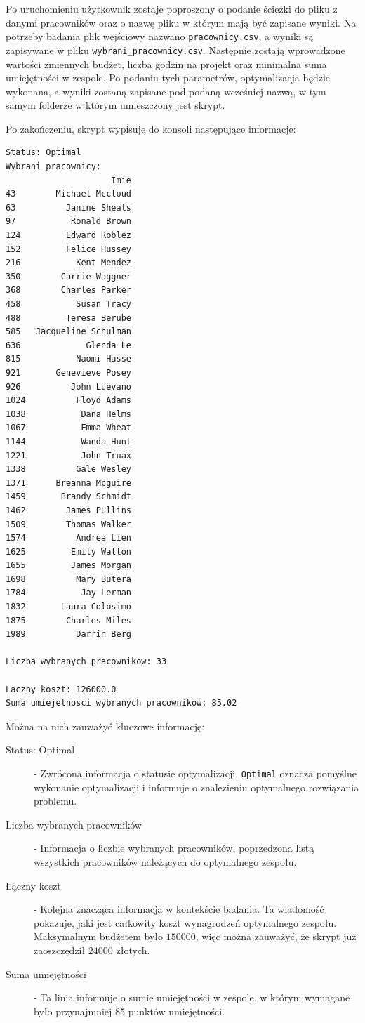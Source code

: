    \par Po uruchomieniu użytkownik zostaje poproszony o podanie ścieżki do pliku z danymi pracowników oraz o nazwę pliku w którym mają być zapisane wyniki. Na potrzeby badania plik wejściowy nazwano \verb|pracownicy.csv|, a wyniki są zapisywane w pliku \verb|wybrani_pracownicy.csv|. Następnie zostają wprowadzone wartości zmiennych budżet, liczba godzin na projekt oraz minimalna suma umiejętności w zespole. Po podaniu tych parametrów, optymalizacja będzie wykonana, a wyniki zostaną zapisane pod podaną wcześniej nazwą, w tym samym folderze w którym umieszczony jest skrypt.

    \par Po zakończeniu, skrypt wypisuje do konsoli następujące informacje:

\begin{lstlisting}[language=bash, caption=Terminal po zakończeniu skryptu\\ Źródło:\textit{ opracowanie własne}]
Status: Optimal
Wybrani pracownicy:
                     Imie
43        Michael Mccloud
63          Janine Sheats
97           Ronald Brown
124         Edward Roblez
152         Felice Hussey
216           Kent Mendez
350        Carrie Waggner
368        Charles Parker
458           Susan Tracy
488         Teresa Berube
585   Jacqueline Schulman
636             Glenda Le
815           Naomi Hasse
921       Genevieve Posey
926          John Luevano
1024          Floyd Adams
1038           Dana Helms
1067           Emma Wheat
1144           Wanda Hunt
1221           John Truax
1338          Gale Wesley
1371      Breanna Mcguire
1459       Brandy Schmidt
1462        James Pullins
1509        Thomas Walker
1574          Andrea Lien
1625         Emily Walton
1655         James Morgan
1698          Mary Butera
1784           Jay Lerman
1832       Laura Colosimo
1875        Charles Miles
1989          Darrin Berg

Liczba wybranych pracownikow: 33

Laczny koszt: 126000.0
Suma umiejetnosci wybranych pracownikow: 85.02
\end{lstlisting}
    
    Można na nich zauważyć kluczowe informację:
    \begin{description}
        \item[Status: Optimal] - Zwrócona informacja o statusie optymalizacji, \verb|Optimal| oznacza pomyślne wykonanie optymalizacji i informuje o znalezieniu optymalnego rozwiązania problemu.
        \item[Liczba wybranych pracowników] - Informacja o liczbie wybranych pracowników, poprzedzona listą wszystkich pracowników należących do optymalnego zespołu.
        \item[Łączny koszt] - Kolejna znacząca informacja w kontekście badania. Ta wiadomość pokazuje, jaki jest całkowity koszt wynagrodzeń optymalnego zespołu. Maksymalnym budżetem było $150 000$, więc można zauważyć, że skrypt już zaoszczędził $24 000$ złotych.
        \item[Suma umiejętności] - Ta linia informuje o sumie umiejętności w zespole, w którym wymagane było przynajmniej 85 punktów umiejętności.
    \end{description}
    

